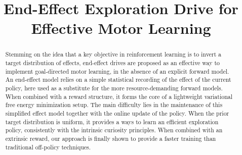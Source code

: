 \documentclass[runningheads]{llncs}
\begin{document}
%
\title{End-Effect Exploration Drive for Effective Motor Learning}
%
%
%
%
%
\maketitle              %
%
\begin{abstract}
Stemming on the idea that a key objective in reinforcement learning is to invert a target distribution of effects, end-effect drives are proposed as an effective way to implement goal-directed motor learning, in the absence of an explicit forward model.  An end-effect model relies on a simple statistical recording of the effect of the current policy, here used  as a substitute for the more resource-demanding forward models. When combined with a reward structure, it forms the core of a lightweight variational free energy minimization setup. The main difficulty lies in the maintenance of this simplified effect model together with the online update of the policy. When the prior target distribution is uniform, it provides a ways to learn an efficient exploration policy, consistently with the intrinsic curiosity principles. When combined with an extrinsic reward, our approach is finally shown to provide a faster training than traditional off-policy techniques.  
\end{abstract}
%
%
%
\end{document}
